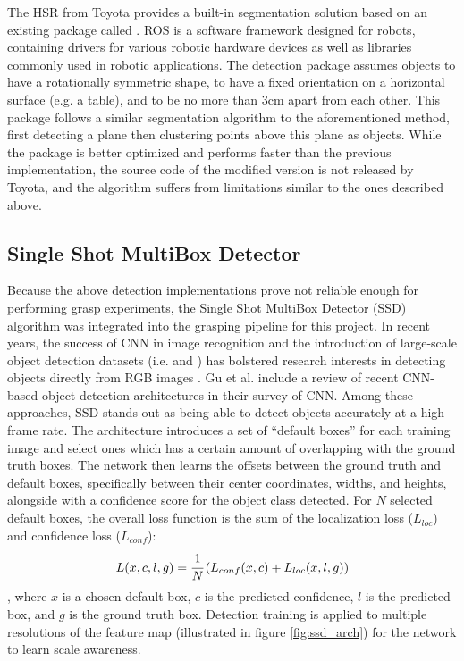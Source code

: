 The HSR from Toyota provides a built-in segmentation solution based on an existing
 package called \linebreak
{}. ROS is a software
framework designed for robots, containing drivers for various robotic hardware devices as well as libraries commonly
used in robotic applications. The detection package assumes objects to have a rotationally symmetric shape, to have a
fixed orientation on a horizontal surface (e.g. a table), and to be no more than 3cm apart from each other. This
package follows a similar segmentation algorithm to the aforementioned method, first detecting a plane then clustering
points above this plane as objects. While the package is better optimized and performs faster than the previous
implementation, the source code of the modified version is not released by Toyota, and the algorithm suffers from
limitations similar to the ones described above.

\subsection{Single Shot MultiBox Detector}


Because the above detection implementations prove not reliable enough for performing grasp experiments, the Single Shot
MultiBox Detector (SSD) algorithm \cite{Liu2016SSD} was integrated into the grasping pipeline for this project. In
recent years, the success of CNN in image recognition and the introduction of large-scale object detection datasets
(i.e.  and
) has bolstered research interests in
detecting objects directly from RGB images \cite{Gu2018}. Gu et al. \cite{Gu2018} include a review of recent CNN-based
object detection architectures in their survey of CNN. Among these approaches, SSD stands out as being able to detect
objects accurately at a high frame rate. The architecture introduces a set of ``default boxes'' for each training image
and select ones which has a certain amount of overlapping with the ground truth boxes. The network then learns the
offsets between the ground truth and default boxes, specifically between their center coordinates, widths, and heights,
alongside with a confidence score for the object class detected. For $ N $ selected default boxes, the overall loss
function is the sum of the localization loss ($ L_{loc} $) and confidence loss ($ L_{conf} $):
\[ L(x,c,l,g) = \cfrac{1}{N} \left( L_{conf}(x, c) + L_{loc}(x,l,g) \right) \],
where $ x $ is a chosen default box, $ c $ is the predicted confidence, $ l $ is the predicted box, and $ g $ is the
ground truth box. Detection training is applied to multiple resolutions of the feature map (illustrated in figure
\ref{fig:ssd_arch}) for the network to learn scale awareness.

